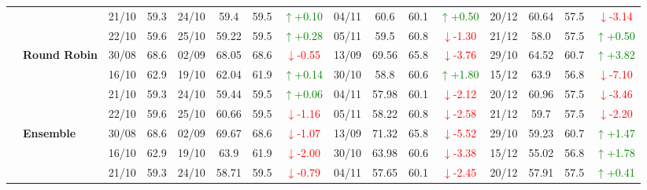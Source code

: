 {\begin{longtable}{llcc|cccc|cccc|cccc}
&
& 21/10 & 59.3 & 24/10 & 59.4 & 59.5 & \textcolor{green}{\(\uparrow\)+0.10} & 04/11 & 60.6 & 60.1 & \textcolor{green}{\(\uparrow\)+0.50} & 20/12 & 60.64 & 57.5 & \textcolor{red}{\(\downarrow\)-3.14} \\

&
& 22/10 & 59.6 & 25/10 & 59.22 & 59.5 & \textcolor{green}{\(\uparrow\)+0.28} & 05/11 & 59.5 & 60.8 & \textcolor{red}{\(\downarrow\)-1.30} & 21/12 & 58.0 & 57.5 & \textcolor{green}{\(\uparrow\)+0.50} \\
\cmidrule(lr){2-16}


& \textbf{Round Robin}
& 30/08 & 68.6 & 02/09 & 68.05 & 68.6 & \textcolor{red}{\(\downarrow\)-0.55} & 13/09 & 69.56 & 65.8 & \textcolor{red}{\(\downarrow\)-3.76} & 29/10 & 64.52 & 60.7 & \textcolor{green}{\(\uparrow\)+3.82} \\

&
& 16/10 & 62.9 & 19/10 & 62.04 & 61.9 & \textcolor{green}{\(\uparrow\)+0.14} & 30/10 & 58.8 & 60.6 & \textcolor{green}{\(\uparrow\)+1.80} & 15/12 & 63.9 & 56.8 & \textcolor{red}{\(\downarrow\)-7.10} \\

&
& 21/10 & 59.3 & 24/10 & 59.44 & 59.5 & \textcolor{green}{\(\uparrow\)+0.06} & 04/11 & 57.98 & 60.1 & \textcolor{red}{\(\downarrow\)-2.12} & 20/12 & 60.96 & 57.5 & \textcolor{red}{\(\downarrow\)-3.46} \\

&
& 22/10 & 59.6 & 25/10 & 60.66 & 59.5 & \textcolor{red}{\(\downarrow\)-1.16} & 05/11 & 58.22 & 60.8 & \textcolor{red}{\(\downarrow\)-2.58} & 21/12 & 59.7 & 57.5 & \textcolor{red}{\(\downarrow\)-2.20} \\
\cmidrule(lr){2-16}

& \textbf{Ensemble}
& 30/08 & 68.6 & 02/09 & 69.67 & 68.6 & \textcolor{red}{\(\downarrow\)-1.07} & 13/09 & 71.32 & 65.8 & \textcolor{red}{\(\downarrow\)-5.52} & 29/10 & 59.23 & 60.7 & \textcolor{green}{\(\uparrow\)+1.47} \\

&
& 16/10 & 62.9 & 19/10 & 63.9 & 61.9 & \textcolor{red}{\(\downarrow\)-2.00} & 30/10 & 63.98 & 60.6 & \textcolor{red}{\(\downarrow\)-3.38} & 15/12 & 55.02 & 56.8 & \textcolor{green}{\(\uparrow\)+1.78} \\

&
& 21/10 & 59.3 & 24/10 & 58.71 & 59.5 & \textcolor{red}{\(\downarrow\)-0.79} & 04/11 & 57.65 & 60.1 & \textcolor{red}{\(\downarrow\)-2.45} & 20/12 & 57.91 & 57.5 & \textcolor{green}{\(\uparrow\)+0.41} \\


\end{longtable}}
